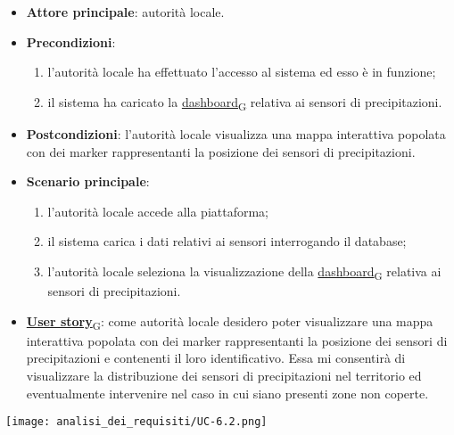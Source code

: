 \newpage

\begin{itemize}
	\item \textbf{Attore principale}: autorità locale.
	\item \textbf{Precondizioni}:
	      \begin{enumerate}
		      \item l'autorità locale ha effettuato l'accesso al sistema ed esso è in funzione;
		      \item il sistema ha caricato la \href{https://7last.github.io/docs/rtb/documentazione-interna/glossario\#dashboard}{dashboard\textsubscript{G}} relativa ai sensori di precipitazioni.
	      \end{enumerate}
	\item \textbf{Postcondizioni}: l'autorità locale visualizza una mappa interattiva popolata con dei marker rappresentanti la posizione dei sensori di precipitazioni.
	\item \textbf{Scenario principale}:
	      \begin{enumerate}
		      \item l'autorità locale accede alla piattaforma;
		      \item il sistema carica i dati relativi ai sensori interrogando il database;
		      \item l'autorità locale seleziona la visualizzazione della \href{https://7last.github.io/docs/rtb/documentazione-interna/glossario\#dashboard}{dashboard\textsubscript{G}} relativa ai sensori di precipitazioni.
	      \end{enumerate}
	\item \href{https://7last.github.io/docs/rtb/documentazione-interna/glossario\#user-story}{\textbf{User story}\textsubscript{G}}:
	      come autorità locale desidero poter visualizzare una mappa interattiva popolata con dei marker rappresentanti la posizione dei sensori di precipitazioni
	      e contenenti il loro identificativo. Essa mi consentirà di visualizzare la distribuzione dei sensori di precipitazioni nel territorio ed
	      eventualmente intervenire nel caso in cui siano presenti zone non coperte.
\end{itemize}
\begin{center}
	\texttt{[image: analisi\_dei\_requisiti/UC-6.2.png]}
\end{center}


